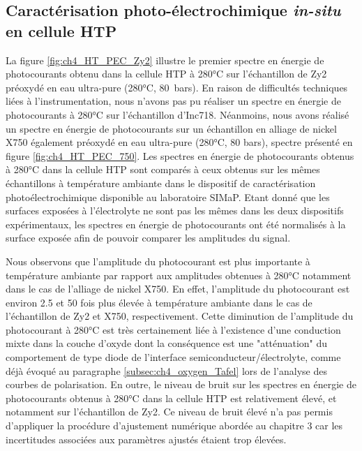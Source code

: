\begin{refsection}
    


    \section{Caractérisation photo-électrochimique  \emph{in-situ} en cellule HTP}\label{sec:ch4_HT_PEC}


    La figure \ref{fig:ch4_HT_PEC_Zy2} illustre le premier spectre en énergie de photocourants obtenu dans la cellule HTP à 280°C sur
    l’échantillon de Zy2 préoxydé en eau ultra-pure (280°C, 80~bars). En raison de difficultés techniques liées à
    l’instrumentation, nous n’avons pas pu réaliser un spectre en énergie de photocourants à 280°C sur l’échantillon
    d’Inc718. Néanmoins, nous avons réalisé un spectre en énergie de photocourants sur un échantillon en alliage de
    nickel X750 également préoxydé en eau ultra-pure (280°C, 80 bars), spectre présenté en figure
    \ref{fig:ch4_HT_PEC_750}. Les spectres en
    énergie de photocourants obtenus à 280°C dans la cellule HTP sont comparés à ceux obtenus sur les mêmes échantillons
    à température ambiante dans le dispositif de caractérisation photoélectrochimique disponible au laboratoire SIMaP.
    Etant donné que les surfaces exposées à l’électrolyte ne sont pas les mêmes dans les deux dispositifs expérimentaux,
    les spectres en énergie de photocourants ont été normalisés à la surface exposée afin de pouvoir comparer les
    amplitudes du signal.

    Nous observons que l’amplitude du photocourant est plus importante à température ambiante par rapport aux amplitudes
    obtenues à 280°C notamment dans le cas de l’alliage de nickel X750. En effet, l’amplitude du photocourant est
    environ 2.5 et 50 fois plus élevée à température ambiante dans le cas de l’échantillon de Zy2 et X750,
    respectivement. Cette diminution de l’amplitude du photocourant à 280°C est très certainement liée à l’existence
    d’une conduction mixte dans la couche d’oxyde dont la conséquence est une "atténuation" du comportement de type
    diode de l’interface semiconducteur/électrolyte, comme déjà évoqué au paragraphe \ref{subsec:ch4_oxygen_Tafel} 
    lors de l’analyse des courbes
    de polarisation. En outre, le niveau de bruit sur les spectres en énergie de photocourants obtenus à 280°C dans la
    cellule HTP est relativement élevé, et notamment sur l’échantillon de Zy2. Ce niveau de bruit élevé n’a pas permis
    d’appliquer la procédure d’ajustement numérique abordée au chapitre 3 car les incertitudes associées aux paramètres
    ajustés étaient trop élevées.


\end{refsection}
